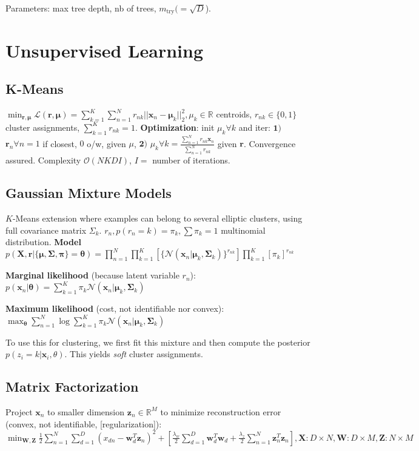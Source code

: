 \documentclass[10pt,a4paper,landscape]{extarticle}
\renewcommand{\bf}[1]{\ensuremath{\mathbf{#1}}}
\begin{document}
\begin{multicols*}{4}
Parameters: max tree depth, nb of trees, $m_{\text{try}} (= \sqrt{D}$).

\section{Unsupervised Learning}
\subsection{K-Means}
$\min_{\bf{r,\mu}} \mathcal{L}(\bf{r, \mu}) = 
\sum_{k=1}^K \sum_{n=1}^N r_{nk} ||\bf{x}_n - \bf{\mu}_k ||_2^2, \mu_k \in \mathbb{R}$ centroids, $r_{nk} \in \{0,1\}$  cluster assignments, $\sum_{k=1}^K r_{nk} = 1$.
\textbf{Optimization}: init $\mu_k \forall k$ and iter: $\bf{1)}$ $\bf{r}_n \forall n = 1$ if closest, $0$ o/w, given $\mu$, 
$\bf{2)}$ $\mu_k \forall k = 
\frac{\sum^N_{n=1} r_{nk} \bf{x}_n}{\sum^N_{n=1} r_{nk}}$
given $\bf{r}$.
Convergence assured. Complexity $\mathcal{O}(NKDI)$, $I =$ number of iterations.

\subsection{Gaussian Mixture Models}
$K$-Means extension where examples can belong to several elliptic clusters, using full covariance matrix $\Sigma_k$. $r_n, p(r_n=k)=\pi_k, \sum \pi_k = 1$ multinomial distribution.
\textbf{Model} $p(\bf{X}, \bf{r} | \{\bf{\mu}, \bf{\Sigma}, \bf{\pi}\} = \bf{\theta}) = \prod\limits_{n=1}^N \prod\limits_{k=1}^K [\{\mathcal{N}(\bf{x}_n | \bf{\mu}_k , \bf{\Sigma}_k ) \}^{r_{nk}}] \prod\limits_{k=1}^K [\pi_k]^{r_{nk}}$

\textbf{Marginal likelihood} (because latent variable $r_n$): $p(\bf{x}_n | \bf{\theta}) = \sum_{k=1}^K \pi_k \mathcal{N}(\bf{x}_n | \bf{\mu}_k, \bf{\Sigma}_k)$

\textbf{Maximum likelihood} (cost, not identifiable nor convex): $\max_{\bf{\theta}} \sum_{n=1}^N \log \sum_{k=1}^K \pi_k \mathcal{N} ( \bf{x}_n | \bf{\mu}_k , \bf{\Sigma}_k)$

To use this for clustering, we first fit this mixture and then compute the posterior $p(z_i = k | \bf{x}_i, \theta)$. This yields \textit{soft} cluster assignments.

\subsection{Matrix Factorization}

Project $\bf{x}_n$ to smaller dimension $\bf{z}_n \in \mathbb{R}^M$ to minimize reconstruction error (convex, not identifiable, [regularization]): $\min_{\bf{W, Z}} \frac{1}{2} \sum_{n=1}^N \sum_{d=1}^D (x_{dn} - \bf{w}_d^T \bf{z}_n )^2 
+ [\frac{\lambda_w}{2} \sum_{d=1}^D \bf{w}_d^T \bf{w}_d + \frac{\lambda_z}{2} \sum_{n=1}^N \bf{z}_n^T \bf{z}_n], 
\bf{X}: D \times N, \bf{W}: D \times M, \bf{Z}: N \times M$


\end{multicols*}
\end{document}
